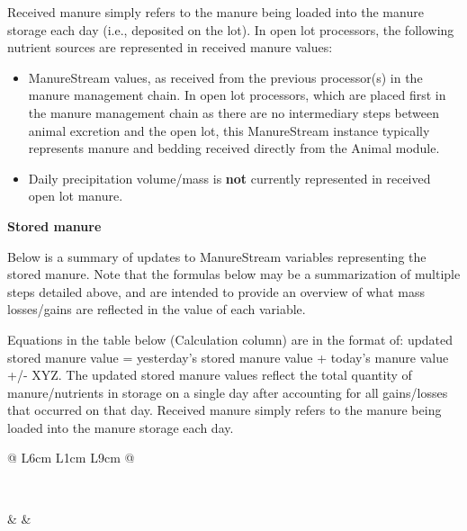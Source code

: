 \begin{refsection}
Received manure simply refers to the manure being loaded into the manure storage each day 
(i.e., deposited on the lot). In open lot processors, the following nutrient sources are represented in received manure values:

\begin{itemize}
    \item ManureStream values, as received from the previous processor(s) in the manure management chain. In open lot processors, which are placed first in the manure management chain as there are no intermediary steps between animal excretion and the open lot, this ManureStream instance typically represents manure and bedding received directly from the Animal module.
    \item Daily precipitation volume/mass is \textbf{not} currently represented in received open lot manure.
\end{itemize}
\vspace{0.5cm}

\textbf{Stored manure}
\vspace{ 0.25cm}

Below is a summary of updates to ManureStream variables representing the stored manure. Note that the formulas below may be a summarization of multiple steps detailed above, and are intended to provide an overview of what mass losses/gains are reflected in the value of each variable.
\vspace{0.2cm}

Equations in the table below (Calculation column) are in the format of: updated stored manure value = yesterday’s stored manure value + today’s manure value +/- XYZ. The updated stored manure values reflect the total quantity of manure/nutrients in storage on a single day after accounting for all gains/losses that occurred on that day. Received manure simply refers to the manure being loaded into the manure storage each day. 
\vspace{0.5cm}



\renewcommand{\arraystretch}{1.3}
\begin{longtable}{@{} L{6cm} L{1cm} L{9cm} @{}}
\caption{Calculated manure storage variables and their units} \\
\toprule

 &
 &
 \\

\midrule
\endfirsthead


\end{longtable}
\end{refsection}
